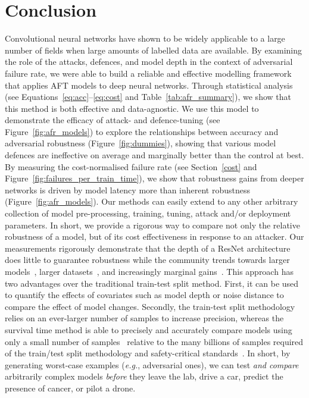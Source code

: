 \section{Conclusion}
Convolutional neural networks have shown to be widely applicable to a large number of fields when large amounts of labelled data are available.
By examining the role of the attacks, defences, and model depth in the context of adversarial failure rate, we were able to build a reliable and effective modelling framework that applies AFT models to deep neural networks.
Through statistical analysis (see Equations~\ref{eq:acc}--\ref{eq:cost} and Table~\ref{tab:afr_summary}), we show that this method is both effective and data-agnostic.  We use this model to demonstrate the efficacy of attack- and defence-tuning (see Figure~\ref{fig:afr_models}) to  explore the relationships between accuracy and adversarial robustness (Figure~\ref{fig:dummies}), showing that various model defences are ineffective on average and marginally better than the control at best.
By measuring the cost-normalised failure rate (see Section~\ref{cost} and Figure~\ref{fig:failures_per_train_time}), we show that robustness gains from deeper networks is driven by model latency more than inherent robustness (Figure~\ref{fig:afr_models}).
Our methods can easily extend to any other arbitrary collection of model pre-processing, training, tuning, attack and/or deployment parameters. In short, we provide a rigorous way to compare not only the relative robustness of a model, but of its cost effectiveness in response to an attacker.
Our measurements rigorously demonstrate  that the depth of a ResNet architecture does little to guarantee robustness while the community trends towards larger models~\cite{desislavov2021compute}, larger datasets~\cite{desislavov2021compute,bailly2022effects}, and increasingly marginal gains~\cite{sun2017revisiting}. This approach has two advantages over the traditional train-test split method.
First, it can be used to quantify the effects of covariates such as model depth or noise distance to compare the effect of model changes. Secondly, the train-test split methodology relies on an ever-larger number of samples to increase precision, whereas the survival time method is able to precisely and accurately compare models using only a small number of samples~\cite{schmoor2000sample,lachin1981introduction} relative to the many billions of samples required of the train/test split methodology and safety-critical standards~\cite{iso26262,IEC61508,IEC62034,meyers}.
In short, by generating worst-case examples (\textit{e.g.}, adversarial ones), we can test \textit{and compare} arbitrarily complex models \textit{before} they leave the lab, drive a car, predict the presence of cancer, or pilot a drone.
